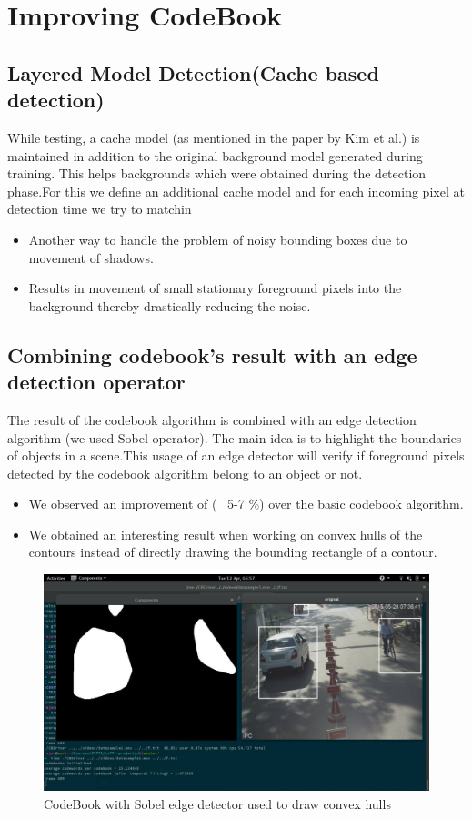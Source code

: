 \documentclass[12pt,a4paper]{article}
\begin{document}
\section{Improving CodeBook}
\subsection{Layered Model Detection(Cache based detection)}
While testing, a cache model (as mentioned in the paper by Kim et al.) is maintained in addition to the original background model generated during training. This helps
backgrounds which were obtained during the detection phase.For this we define an additional cache model and for each incoming pixel at detection time we try to matchin
\begin{itemize}
\item Another way to handle the problem of noisy bounding boxes due to movement of shadows.
\item Results in movement of small stationary foreground pixels into the background thereby drastically reducing the noise.
\end{itemize}

\subsection{Combining codebook's result with an edge detection operator}
The result of the codebook algorithm is combined with an edge detection algorithm (we used Sobel operator).
The main idea is to highlight the boundaries of objects in a scene.This usage of an edge detector will verify if foreground pixels detected by the codebook algorithm belong to an object or not.
\begin{itemize}
\item We observed an improvement of (~ 5-7 \%) over the basic codebook algorithm.
\item We obtained an interesting result when working on convex hulls of the contours instead of directly drawing the bounding rectangle of a contour.
\end{itemize}

\begin{figure}[h]
\caption{CodeBook with Sobel edge detector used to draw convex hulls}
\centering
\includegraphics[width=1.0\textwidth]{sobel.png}
\end{figure}
\end{document}
